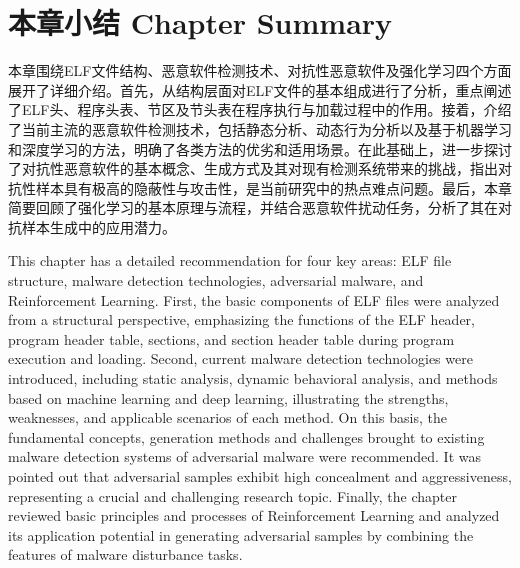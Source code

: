 \section{本章小结 Chapter Summary}

本章围绕ELF文件结构、恶意软件检测技术、对抗性恶意软件及强化学习四个方面展开了详细介绍。首先，从结构层面对ELF文件的基本组成进行了分析，重点阐述了ELF头、程序头表、节区及节头表在程序执行与加载过程中的作用。接着，介绍了当前主流的恶意软件检测技术，包括静态分析、动态行为分析以及基于机器学习和深度学习的方法，明确了各类方法的优劣和适用场景。在此基础上，进一步探讨了对抗性恶意软件的基本概念、生成方式及其对现有检测系统带来的挑战，指出对抗性样本具有极高的隐蔽性与攻击性，是当前研究中的热点难点问题。最后，本章简要回顾了强化学习的基本原理与流程，并结合恶意软件扰动任务，分析了其在对抗样本生成中的应用潜力。

This chapter has a detailed recommendation for four key areas: ELF file structure, malware detection technologies, adversarial malware, and Reinforcement Learning. First, the basic components of ELF files were analyzed from a structural perspective, emphasizing the functions of the ELF header, program header table, sections, and section header table during program execution and loading. Second, current malware detection technologies were introduced, including static analysis, dynamic behavioral analysis, and methods based on machine learning and deep learning, illustrating the strengths, weaknesses, and applicable scenarios of each method. On this basis, the fundamental concepts, generation methods and challenges brought to existing malware detection systems of adversarial malware were recommended. It was pointed out that adversarial samples exhibit high concealment and aggressiveness, representing a crucial and challenging research topic. Finally, the chapter reviewed basic principles and processes of Reinforcement Learning and analyzed its application potential in generating adversarial samples by combining the features of malware disturbance tasks.  


